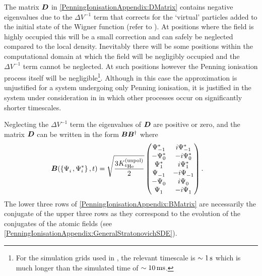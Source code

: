 The matrix $\bm{D}$ in \eqref{PenningIonisationAppendix:DMatrix} contains negative eigenvalues due to the $\Delta V^{-1}$ term that corrects for the `virtual' particles added to the initial state of the Wigner function (refer to ). At positions where the field is highly occupied this will be a small correction and can safely be neglected compared to the local density. Inevitably there will be some positions within the computational domain at which the field will be negligibly occupied and the $\Delta V^{-1}$ term cannot be neglected. At such positions however the Penning ionisation process itself will be negligible\footnote{For the simulation grids used in , the relevant timescale is $\sim \unit[1]{s}$ which is much longer than the simulated time of $\sim \unit[10]{ms}$.}. Although in this case the approximation is unjustified for a system undergoing only Penning ionisation, it is justified in the system under consideration in  in which other processes occur on significantly shorter timescales.

Neglecting the $\Delta V^{-1}$ term the eigenvalues of $\bm{D}$ are positive or zero, and the matrix $\bm{D}$ can be written in the form $\bm{B}\bm{B}^\dagger$ where
\begin{align}
    \vect{B}(\left\{\Psi_i^{\phantom{*}}, \Psi_i^*\right\}, t) &= \sqrt{\frac{3 \Kunpol}{2}}
    \begin{pmatrix}
        \Psi_{-1}^* & i \Psi_{-1}^* \\
        -\Psi_0^* & -i \Psi_0^* \\
        \Psi_1^* & i \Psi_1^* \\
        \Psi_{-1}^{\phantom{*}} & -i \Psi_{-1}^{\phantom{*}} \\
        -\Psi_0^{\phantom{*}} & i \Psi_0^{\phantom{*}} \\
        \Psi_{1}^{\phantom{*}} & -i \Psi_{1}^{\phantom{*}}
    \end{pmatrix}.
    \label{PenningIonisationAppendix:BMatrix}
\end{align}
The lower three rows of \eqref{PenningIonisationAppendix:BMatrix} are necessarily the conjugate of the upper three rows as they correspond to the evolution of the conjugates of the atomic fields (see \eqref{PenningIonisationAppendix:GeneralStratonovichSDE}).

